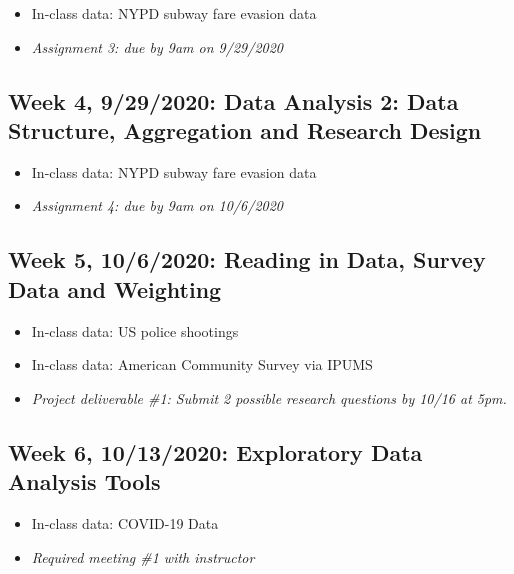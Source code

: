 \documentclass[11pt,]{article}
\providecommand{\tightlist}{%
  \setlength{\itemsep}{0pt}\setlength{\parskip}{0pt}}
\begin{document}
\begin{itemize}
\tightlist
\item
  In-class data: NYPD subway fare evasion data
\item
  \emph{Assignment 3: due by 9am on 9/29/2020} \medskip
\end{itemize}

\hypertarget{week-4-9292020-data-analysis-2-data-structure-aggregation-and-research-design}{%
\subsection{Week 4, 9/29/2020: Data Analysis 2: Data Structure,
Aggregation and Research
Design}\label{week-4-9292020-data-analysis-2-data-structure-aggregation-and-research-design}}

\begin{itemize}
\tightlist
\item
  In-class data: NYPD subway fare evasion data
\item
  \emph{Assignment 4: due by 9am on 10/6/2020} \medskip
\end{itemize}

\hypertarget{week-5-1062020-reading-in-data-survey-data-and-weighting}{%
\subsection{Week 5, 10/6/2020: Reading in Data, Survey Data and
Weighting}\label{week-5-1062020-reading-in-data-survey-data-and-weighting}}

\begin{itemize}
\tightlist
\item
  In-class data: US police shootings
\item
  In-class data: American Community Survey via IPUMS
\item
  \emph{Project deliverable \#1: Submit 2 possible research questions by
  10/16 at 5pm.} \medskip
\end{itemize}

\hypertarget{week-6-10132020-exploratory-data-analysis-tools}{%
\subsection{Week 6, 10/13/2020: Exploratory Data Analysis
Tools}\label{week-6-10132020-exploratory-data-analysis-tools}}

\begin{itemize}
\tightlist
\item
  In-class data: COVID-19 Data
\item
  \emph{Required meeting \#1 with instructor} \medskip
\end{itemize}
\end{document}
